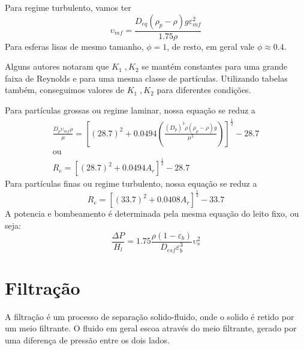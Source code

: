 Para regime turbulento, vamos ter
\begin{equation}
    \upsilon _{mf} = \frac{D_{eq} (\rho_{p} -\rho)g \varepsilon_{mf}^{2}}{1.75\rho}
\end{equation}
Para esferas lisas de mesmo tamanho, \(\phi = 1\), de resto, em geral vale \(\phi \approx 0.4\).
\par
Alguns autores notaram que \(K_1 \;, K_2\) se mantém constantes para uma grande faixa de Reynolds e
para uma mesma classe de partículas. Utilizando tabelas também, conseguimos valores de \(K_1 \;,
K_2\) para diferentes condições. \par
Para partículas grossas ou regime laminar, nossa equação se reduz a 
\begin{align}
    \frac{D_p \upsilon_{mf} \rho  }{\mu } = \left[ (28.7)^{2} + 0.0494\left( \frac{(D_p)^{3} \rho (\rho _{p} -\rho )g}{\mu ^{2} } \right)  \right]^{\frac{1}{2}} - 28.7\\
    \text{ou}\\
    R_e = \left[ (28.7)^{2} + 0.0494A_{r}  \right]^\frac{1}{2} - 28.7
\end{align}
Para partículas finas ou regime turbulento, nossa equação se reduz a
\begin{equation}
    R_e = \left[ (33.7)^{2} + 0.0408A_r \right]^\frac{1}{2} - 33.7 
\end{equation}
A potencia e bombeamento é determinada pela mesma equação do leito fixo, ou seja:
\begin{equation}
    \frac{\Delta P}{H_{l} } = 1.75 \frac{\rho (1 - \varepsilon _{b} )}{D_{esf}\varepsilon _{b} ^{3} } \upsilon _{s} ^{2}
\end{equation}
\section{Filtração}
A filtração é um processo de separação solido-fluido, onde o solido é retido por um meio filtrante. 
O fluido em geral escoa através do meio filtrante, gerado por uma diferença de pressão entre os dois
lados. \par
